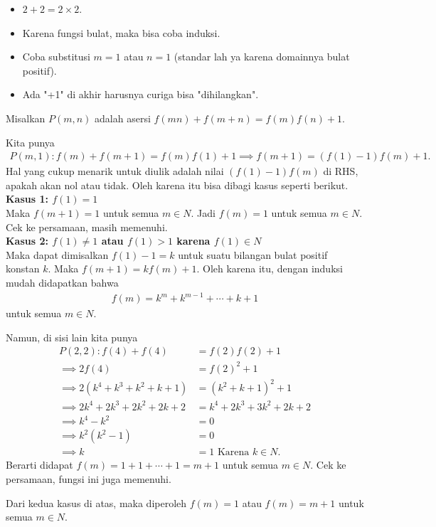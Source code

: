 
\begin{remark*}

\begin{itemize}
    \item $2+2 = 2\times2$.
    \item Karena fungsi bulat, maka bisa coba induksi.
    \item Coba substitusi $m=1$ atau $n=1$ (standar lah ya karena domainnya bulat positif).
    \item Ada "+1" di akhir harusnya curiga bisa "dihilangkan".
\end{itemize}
\end{remark*}
\begin{solusi}

Misalkan $P(m,n)$ adalah asersi $f(mn)+f(m+n)=f(m)f(n)+1$.

Kita punya
\begin{align*}
    P(m,1): f(m)+f(m+1)=f(m)f(1)+1 \implies f(m+1)=(f(1)-1)f(m)+1.
\end{align*}
Hal yang cukup menarik untuk diulik adalah nilai $(f(1)-1)f(m)$ di RHS, apakah akan nol atau tidak. Oleh karena itu bisa dibagi kasus seperti berikut.\\

\textbf{Kasus 1: $f(1)=1$}\\
Maka $f(m+1)=1$ untuk semua $m\in N$. Jadi $f(m)=1$ untuk semua $m\in N$. Cek ke persamaan, masih memenuhi.\\


\textbf{Kasus 2: $f(1)\neq 1$ atau $f(1)>1$ karena $f(1)\in N$}\\
Maka dapat dimisalkan $f(1)-1=k$ untuk suatu bilangan bulat positif konstan $k$. Maka $f(m+1)=kf(m)+1$. 
Oleh karena itu, dengan induksi mudah didapatkan bahwa 
\begin{align*}
    f(m)=k^{m}+k^{m-1}+\cdots+k+1
\end{align*}
untuk semua $m\in N$.

Namun, di sisi lain kita punya
\begin{align*}
    P(2,2): f(4)+f(4)&=f(2)f(2)+1 \\
    \implies 2f(4)&=f(2)^2+1\\
    \implies 2(k^4+k^3+k^2+k+1)&=(k^2+k+1)^2+1\\
    \implies 2k^4+2k^3+2k^2+2k+2&=k^4+2k^3+3k^2+2k+2\\
    \implies k^4-k^2&=0\\
    \implies k^2(k^2-1)&=0\\
    \implies k&=1 \text{ Karena $k\in N$}.
\end{align*}
Berarti didapat $f(m)=1+1+\cdots+1= m+1$ untuk semua $m\in N$. Cek ke persamaan, fungsi ini juga memenuhi.

Dari kedua kasus di atas, maka diperoleh $f(m)=1$ atau $f(m)=m+1$ untuk semua $m\in N$.
\end{solusi}
